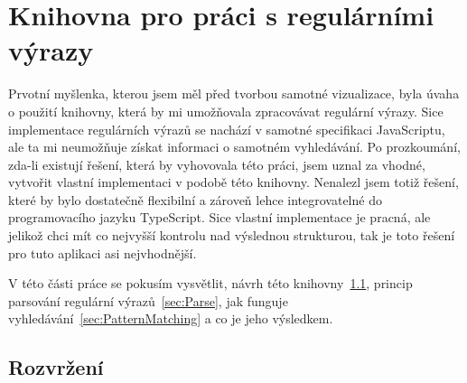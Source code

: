 \chapter{Knihovna pro práci s regulárními výrazy}\label{sec:Implementation1}

Prvotní myšlenka, kterou jsem měl před tvorbou samotné vizualizace, byla úvaha o použití knihovny, 
která by mi umožňovala zpracovávat regulární výrazy.
Sice implementace regulárních výrazů se nachází v samotné specifikaci JavaScriptu,
ale ta mi neumožňuje získat informaci o samotném vyhledávání.
Po prozkoumání, zda-li existují řešení, která by vyhovovala této práci, 
jsem uznal za vhodné, vytvořit vlastní implementaci v podobě této knihovny.
Nenalezl jsem totiž řešení, které by bylo dostatečně flexibilní a 
zároveň lehce integrovatelné do programovacího jazyku TypeScript.
Sice vlastní implementace je pracná, ale jelikož chci mít co nejvyšší kontrolu nad výslednou strukturou, 
tak je toto řešení pro tuto aplikaci asi nejvhodnější. 

V této části práce se pokusím vysvětlit, návrh této knihovny~\ref{sec:Imp1LayoutReal}, 
princip parsování regulární výrazů~\ref{sec:Parse}, jak funguje vyhledávání~\ref{sec:PatternMatching} a co je jeho výsledkem. %

\section{Rozvržení}\label{sec:Imp1LayoutReal}

